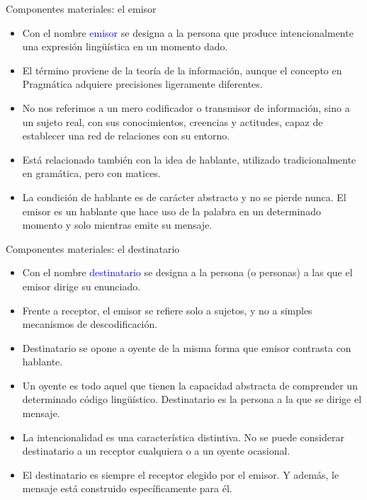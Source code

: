 \documentclass{beamer}
\begin{document}
\begin{frame}{Componentes materiales: el emisor}

\begin{itemize}
	\item Con el nombre \textcolor{blue}{emisor} se designa a la persona que produce intencionalmente una expresión lingüística en un momento dado.
	\item El término proviene de la teoría de la información, aunque el concepto en Pragmática adquiere precisiones ligeramente diferentes.
	\item No nos referimos a un mero codificador o transmisor de información, sino a un sujeto real, con sus conocimientos, creencias y actitudes, capaz de establecer una red de relaciones con su entorno.
	\item Está relacionado también con la idea de hablante, utilizado tradicionalmente en gramática, pero con matices. 
	\item La condición de hablante es de carácter abstracto y no se pierde nunca. El emisor es un hablante que hace uso de la palabra en un determinado momento y solo mientras emite su mensaje. 
\end{itemize}

\end{frame}


\begin{frame}{Componentes materiales: el destinatario}

\begin{itemize}
	\item Con el nombre \textcolor{blue}{destinatario} se designa a la persona (o personas) a las que el emisor dirige su enunciado.
	\item Frente a receptor, el emisor se refiere solo a sujetos, y no a simples mecanismos de descodificación.
	\item Destinatario se opone a oyente de la misma forma que emisor contrasta con hablante.
	\item Un oyente es todo aquel que tienen la capacidad abstracta de comprender un determinado código lingüístico. Destinatario es la persona a la que se dirige el mensaje.
	\item La intencionalidad es una característica distintiva. No se puede considerar destinatario a un receptor cualquiera o a un oyente ocasional.
	\item El destinatario es siempre el receptor elegido por el emisor. Y además, le mensaje está construido específicamente para él.	 
\end{itemize}

\end{frame}
\end{document}

